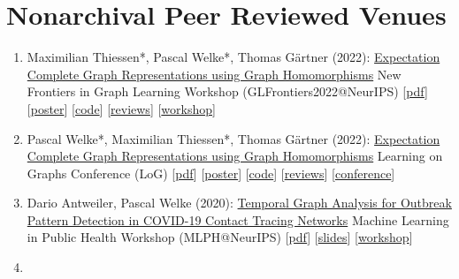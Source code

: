 \documentclass{scrartcl}
\begin{document}
\section{Nonarchival Peer Reviewed Venues}
\begin{enumerate}
\conti
\item
\label{thiessen2022expectation}
Maximilian Thiessen*, Pascal Welke*, Thomas Gärtner (2022):\newline
\href{https://pwelke.github.io/}{Expectation Complete Graph Representations using Graph Homomorphisms}\newline
New Frontiers in Graph Learning Workshop (GLFrontiers2022@NeurIPS)\newline
{\footnotesize
[\href{https://pwelke.github.io/publications/thiessen2022glfrontiers.pdf}{pdf}]
[\href{https://pwelke.github.io/publications/expectation_complete_poster_neurips.pdf}{poster}]
[\href{https://github.com/pwelke/homcount}{code}]
[\href{https://openreview.net/forum?id=Zf-Mn6xzD2B}{reviews}]
[\href{https://glfrontiers.github.io/}{workshop}]
}
\item
\label{welke2022expectation}
Pascal Welke*, Maximilian Thiessen*, Thomas Gärtner (2022):\newline
\href{https://pwelke.github.io/}{Expectation Complete Graph Representations using Graph Homomorphisms}\newline
Learning on Graphs Conference (LoG)\newline
{\footnotesize
[\href{https://pwelke.github.io/publications/welke2022log.pdf}{pdf}]
[\href{https://pwelke.github.io/publications/expectation_complete_poster_neurips.pdf}{poster}]
[\href{https://github.com/pwelke/homcount}{code}]
[\href{https://openreview.net/forum?id=8GJyW4i2oST}{reviews}]
[\href{https://pwelke.github.io/http://log2022.logconference.org/}{conference}]
}
\item
\label{antweiler2020temporal}
Dario Antweiler, Pascal Welke (2020):\newline
\href{https://pwelke.github.io/}{Temporal Graph Analysis for Outbreak Pattern Detection in COVID-19 Contact Tracing Networks}\newline
Machine Learning in Public Health Workshop (MLPH@NeurIPS)\newline
{\footnotesize
[\href{https://pwelke.github.io/publications/antweiler2020temporal.pdf}{pdf}]
[\href{https://pwelke.github.io/publications/antweiler2020temporal-slides.pdf}{slides}]
[\href{https://sites.google.com/nyu.edu/mlph2020/}{workshop}]
}
\item
\label{schulz2018necessity}

\end{enumerate}
\end{document}

